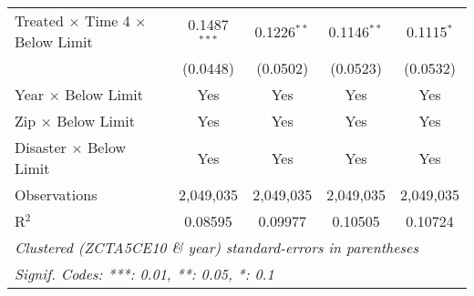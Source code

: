 \begin{tabular*}{0.8\textwidth}{@{\extracolsep{\fill}}lcccc}
   Treated $\times$ Time 4 $\times$ Below Limit     & 0.1487$^{***}$  & 0.1226$^{**}$         & 0.1146$^{**}$         & 0.1115$^{*}$\\   
                                                    & (0.0448)        & (0.0502)              & (0.0523)              & (0.0532)\\   
   \midrule
   Year $\times$ Below Limit                            & Yes             & Yes                   & Yes                   & Yes\\  
   Zip $\times$ Below Limit                             & Yes             & Yes                   & Yes                   & Yes\\  
   Disaster $\times$ Below Limit                        & Yes             & Yes                   & Yes                   & Yes\\  
   \midrule
   Observations                                        & 2,049,035       & 2,049,035             & 2,049,035             & 2,049,035\\  
   R$^2$                                               & 0.08595         & 0.09977               & 0.10505               & 0.10724\\  
   \midrule \midrule
   \multicolumn{5}{l}{\emph{Clustered (ZCTA5CE10 \& year) standard-errors in parentheses}}\\
   \multicolumn{5}{l}{\emph{Signif. Codes: ***: 0.01, **: 0.05, *: 0.1}}\\
\end{tabular*}
